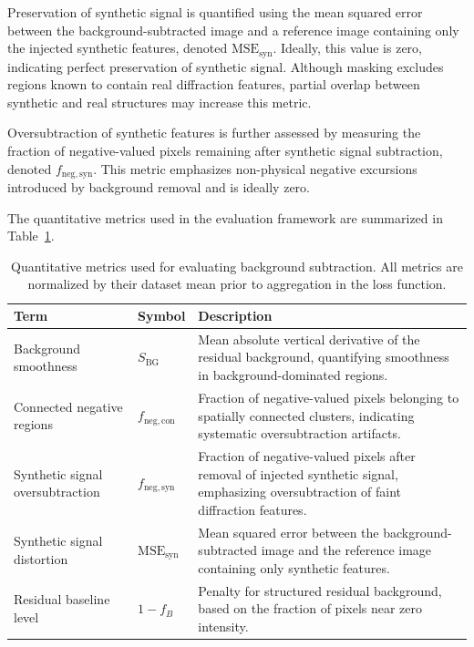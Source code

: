 \documentclass[iucr]{iucrjournals}
\begin{document}
Preservation of synthetic signal is quantified using the mean squared error between the background-subtracted image and a reference image containing only the injected synthetic features, denoted $\mathrm{MSE}_{\mathrm{syn}}$. Ideally, this value is zero, indicating perfect preservation of synthetic signal. Although masking excludes regions known to contain real diffraction features, partial overlap between synthetic and real structures may increase this metric.

Oversubtraction of synthetic features is further assessed by measuring the fraction of negative-valued pixels remaining after synthetic signal subtraction, denoted $f_{\mathrm{neg,syn}}$. This metric emphasizes non-physical negative excursions introduced by background removal and is ideally zero.

The quantitative metrics used in the evaluation framework are summarized in Table~\ref{tab:loss_terms}.

\begin{table}[t]
\caption{Quantitative metrics used for evaluating background subtraction. 
All metrics are normalized by their dataset mean prior to aggregation in the loss function.}
\label{tab:loss_terms}
\centering
\small
\setlength{\tabcolsep}{6pt}
\renewcommand{\arraystretch}{1.1}
\begin{tabular}{@{}llp{7cm}@{}}
\toprule
\textbf{Term} & \textbf{Symbol} & \textbf{Description} \\
\midrule
Background smoothness & $S_{\mathrm{BG}}$ & Mean absolute vertical derivative of the residual background, quantifying smoothness in background-dominated regions. \\
Connected negative regions & $f_{\mathrm{neg,con}}$ & Fraction of negative-valued pixels belonging to spatially connected clusters, indicating systematic oversubtraction artifacts. \\
Synthetic signal oversubtraction & $f_{\mathrm{neg,syn}}$ & Fraction of negative-valued pixels after removal of injected synthetic signal, emphasizing oversubtraction of faint diffraction features. \\
Synthetic signal distortion & $\mathrm{MSE}_{\mathrm{syn}}$ & Mean squared error between the background-subtracted image and the reference image containing only synthetic features. \\
Residual baseline level & $1 - f_{B}$ & Penalty for structured residual background, based on the fraction of pixels near zero intensity. \\
\bottomrule
\end{tabular}
\end{table}
\end{document}
